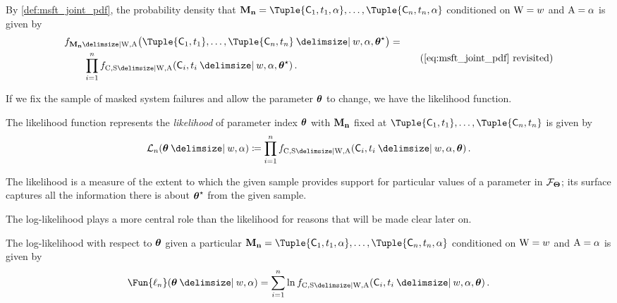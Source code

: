 \documentclass[
    11pt,
    extrafontsizes,
    article,
    oldfontcommands,
    final,
    oneside,
    openany,
    hidelinks]{memoir}
\begin{document}
By \cref{def:msft_joint_pdf}, the probability density that $\mfs = \Tuple{\cand_1,t_1,\alpha},\ldots,\Tuple{\cand_n,t_n,\alpha}$ conditioned on $\mathrm{W} = w$ and $\mathrm{A} = \alpha$ is given by
\begin{equation*}
\begin{split}
& \pdf_{\mfs \Given \RV{W}, \RV{A}}\!\left(\Tuple{\cand_1,t_1},\ldots,\Tuple{\cand_n,t_n} \Given w, \alpha, \tparam{\sysparamvec}\right) =\\
    & \qquad \prod_{i=1}^{n} \pdf_{\rvcand,\sv \Given \RV{W},\RV{A}}(\cand_i, t_i \Given w, \alpha, \tparam\sysparamvec)\,.
\end{split}
\tag{\ref{eq:msft_joint_pdf} revisited}
\end{equation*}

If we fix the sample of masked system failures and allow the parameter $\boldsymbol{\mathbf{\theta}}$ to change, we have the likelihood function.
\begin{definition}
\label{def:likelihood_func}
The likelihood function represents the \emph{likelihood} of parameter index $\boldsymbol{\mathbf{\theta}}$ with $\boldsymbol{\mathbf{M_n}}$ fixed at $\Tuple{\cand_1,t_1},\ldots,\Tuple{\cand_n,t_n}$ is given by
\begin{equation}
    \likelihood_n(\sysparamvec \Given w, \alpha) \coloneqq \prod_{i=1}^{n} \pdf_{\rvcand, \sv \Given \RV{W}, \RV{A}}(\cand_i, t_i \Given w, \alpha, \sysparamvec)\,.
\end{equation}
\end{definition}
The likelihood is a measure of the extent to which the given sample provides support for particular values of a parameter in $\mathcal{F}_{\boldsymbol{\Theta}}$;
its surface captures all the information there is about ${\boldsymbol{\mathbf{\theta}}}^{\star}$ from the given sample.

The log-likelihood plays a more central role than the likelihood for reasons that will be made clear later on.
\begin{definition}
\label{def:general_log_like}
The log-likelihood with respect to $\boldsymbol{\mathbf{\theta}}$ given a particular $\mfs = \Tuple{\cand_1,t_1,\alpha},\ldots,\Tuple{\cand_n,t_n,\alpha}$ conditioned on $\mathrm{W} = w$ and $\mathrm{A} = \alpha$ is given by
\begin{equation}
\label{eq:log_like_mle}
\Fun{\ell_n}(\sysparamvec \Given w, \alpha) = \sum_{i=1}^{n} \ln \pdf_{\rvcand,\sv \Given \RV{W}, \RV{A}}(\cand_i, t_i \Given w, \alpha, \sysparamvec)\,.
\end{equation}
\end{definition}
\end{document}
